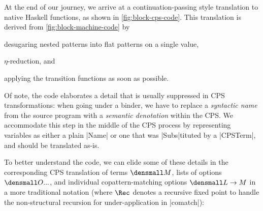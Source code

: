 \documentclass[sigplan,screen]{acmart}
\begin{document}
At the end of our journey, we arrive at a continuation-passing style translation
to native Haskell functions, as shown in \cref{fig:block-cps-code}.  This
translation is derived from \cref{fig:block-machine-code} by
\begin{enumerate*}[(1)]
\item desugaring nested patterns into flat patterns on a single value,
\item $\eta$-reduction, and
\item applying the transition functions as soon as possible.
\end{enumerate*}
Of note, the code elaborates a detail that is usually suppressed in CPS
transformations: when going under a binder, we have to replace a \emph{syntactic
  name} from the source program with a \emph{semantic denotation} within the
CPS.  We accommodate this step in the middle of the CPS process by representing
variables as either a plain \hs|Name| or one that was \hs|Subs|tituted by a
\hs|CPSTerm|, and should be translated as-is.

To better understand the code, we can elide some of these details in the
corresponding CPS translation of terms $\den{M}$, lists of options
$\den{\many{O}}$, and individual copattern-matching options $\den{L \to M}$ in a
more traditional notation (where $\Rec$ denotes a recursive fixed point to
handle the non-structural recursion for under-application in \hs|comatch|):
\end{document}
